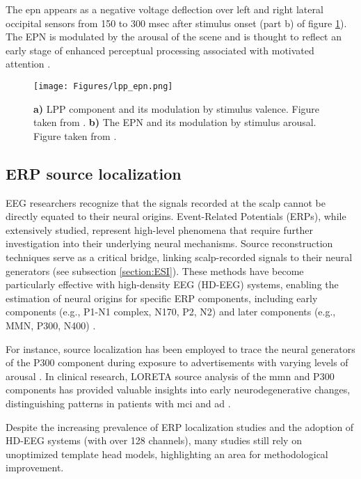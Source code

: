 The \acrfull{epn} appears as a negative voltage deflection over left and right lateral occipital sensors from 150 to 300 msec after stimulus onset (part b) of figure \ref{fig:lpp_epn}). The EPN is modulated by the arousal of the scene and is thought to reflect an early stage of enhanced perceptual processing associated with motivated attention \cite{junghoferFleetingImagesNew2001, farkasEmotionalPerceptionDivergence2023}.

\begin{figure}[H]
	\centering
	\texttt{[image: Figures/lpp\_epn.png]}
	\caption{\textbf{a)} LPP component and its modulation by stimulus valence. Figure taken from \cite{hajcakEventRelatedPotentialsEmotion2010}. \textbf{b)} The EPN and its modulation by stimulus arousal. Figure taken from \cite{junghoferFleetingImagesNew2001}. \label{fig:lpp_epn}}
\end{figure}

\subsection{ERP source localization}

EEG researchers recognize that the signals recorded at the scalp cannot be directly equated to their neural origins. Event-Related Potentials (ERPs), while extensively studied, represent high-level phenomena that require further investigation into their underlying neural mechanisms. Source reconstruction techniques serve as a critical bridge, linking scalp-recorded signals to their neural generators (see subsection \ref{section:ESI}). These methods have become particularly effective with high-density EEG (HD-EEG) systems, enabling the estimation of neural origins for specific ERP components, including early components (e.g., P1-N1 complex, N170, P2, N2) and later components (e.g., MMN, P300, N400) \cite{dattolaFindingsLORETAApplied2020}.

For instance, source localization has been employed to trace the neural generators of the P300 component during exposure to advertisements with varying levels of arousal \cite{daughertyMeasuringConsumerNeural2018}. In clinical research, LORETA source analysis of the \acrfull{mmn} and P300 components has provided valuable insights into early neurodegenerative changes, distinguishing patterns in patients with \acrfull{mci} and \acrfull{ad} \cite{tsolakiAgeinducedDifferencesBrain2017}.

Despite the increasing prevalence of ERP localization studies and the adoption of HD-EEG systems (with over 128 channels), many studies still rely on unoptimized template head models, highlighting an area for methodological improvement.

